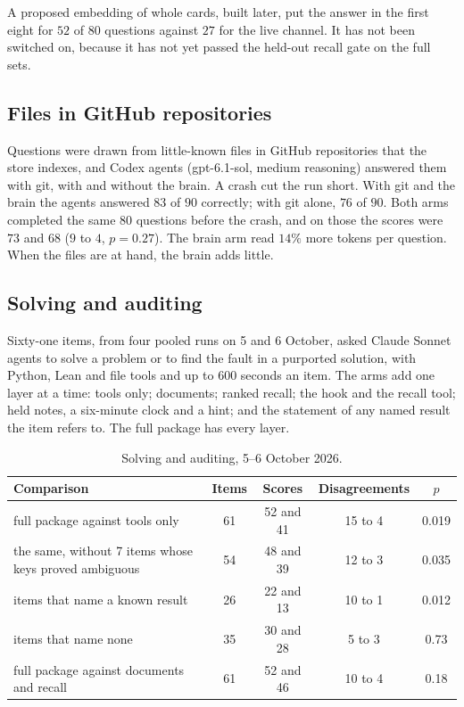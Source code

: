 A proposed embedding of whole cards, built later, put the answer in the first eight for $52$ of $80$ questions against $27$ for the live channel. It has not been switched on, because it has not yet passed the held-out recall gate on the full sets.

\subsection{Files in GitHub repositories}
Questions were drawn from little-known files in GitHub repositories that the store indexes, and Codex agents (gpt-6.1-sol, medium reasoning) answered them with git, with and without the brain. A crash cut the run short. With git and the brain the agents answered $83$ of $90$ correctly; with git alone, $76$ of $90$. Both arms completed the same $80$ questions before the crash, and on those the scores were $73$ and $68$ ($9$ to $4$, $p=0.27$). The brain arm read $14\%$ more tokens per question. When the files are at hand, the brain adds little.

\subsection{Solving and auditing}\label{subsec:solve61}
Sixty-one items, from four pooled runs on 5 and 6 October, asked Claude Sonnet agents to solve a problem or to find the fault in a purported solution, with Python, Lean and file tools and up to $600$ seconds an item. The arms add one layer at a time: tools only; documents; ranked recall; the hook and the recall tool; held notes, a six-minute clock and a hint; and the statement of any named result the item refers to. The full package has every layer.

\begin{table}[ht]
\centering\small
\begin{tabular}{lcccc}
\toprule
Comparison & Items & Scores & Disagreements & $p$\\
\midrule
full package against tools only & 61 & 52 and 41 & 15 to 4 & 0.019\\
the same, without 7 items whose keys proved ambiguous & 54 & 48 and 39 & 12 to 3 & 0.035\\
items that name a known result & 26 & 22 and 13 & 10 to 1 & 0.012\\
items that name none & 35 & 30 and 28 & 5 to 3 & 0.73\\
full package against documents and recall & 61 & 52 and 46 & 10 to 4 & 0.18\\
\bottomrule
\end{tabular}
\caption{Solving and auditing, 5--6 October 2026.}
\label{tab:solve61}
\end{table}

